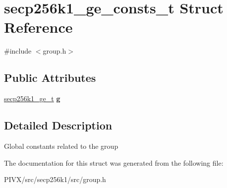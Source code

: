 \hypertarget{structsecp256k1__ge__consts__t}{}\section{secp256k1\+\_\+ge\+\_\+consts\+\_\+t Struct Reference}
\label{structsecp256k1__ge__consts__t}


{\ttfamily \#include $<$group.\+h$>$}

\subsection*{Public Attributes}
\begin{DoxyCompactItemize}
\item 
\mbox{\label{structsecp256k1__ge__consts__t_a194fb0ae067f1ad8f6d8c476e539dc8f}} 
\mbox{\hyperlink{structsecp256k1__ge__t}{secp256k1\+\_\+ge\+\_\+t}} {\bfseries g}
\end{DoxyCompactItemize}


\subsection{Detailed Description}
Global constants related to the group 

The documentation for this struct was generated from the following file\+:\begin{DoxyCompactItemize}
\item 
P\+I\+V\+X/src/secp256k1/src/group.\+h\end{DoxyCompactItemize}

